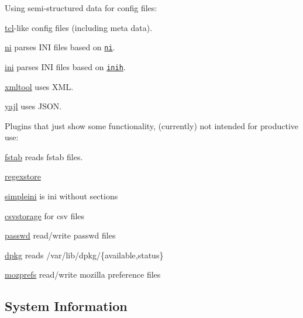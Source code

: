 Using semi-\/structured data for config files\+:


\begin{DoxyItemize}
\item \hyperlink{md_src_plugins_tcl_README_src_plugins_tcl_README_md}{tcl}-\/like config files (including meta data).
\item \hyperlink{md_src_plugins_ni_README_src_plugins_ni_README_md}{ni} parses I\+N\+I files based on \href{https://github.com/chazomaticus/bohr/blob/master/include/bohr/ni.h}{\tt ni}.
\item \hyperlink{md_src_plugins_ini_README_src_plugins_ini_README_md}{ini} parses I\+N\+I files based on \href{http://code.google.com/p/inih/}{\tt inih}.
\item \hyperlink{md_src_plugins_xmltool_README_src_plugins_xmltool_README_md}{xmltool} uses X\+M\+L.
\item \hyperlink{md_src_plugins_yajl_README_src_plugins_yajl_README_md}{yajl} uses J\+S\+O\+N.
\end{DoxyItemize}

Plugins that just show some functionality, (currently) not intended for productive use\+:


\begin{DoxyItemize}
\item \hyperlink{md_src_plugins_fstab_README_src_plugins_fstab_README_md}{fstab} reads fstab files.
\item \hyperlink{md_src_plugins_regexstore_README_src_plugins_regexstore_README_md}{regexstore}
\item \hyperlink{md_src_plugins_simpleini_README_src_plugins_simpleini_README_md}{simpleini} is ini without sections
\item \hyperlink{md_src_plugins_csvstorage_README_src_plugins_csvstorage_README_md}{csvstorage} for csv files
\item \hyperlink{md_src_plugins_passwd_README_src_plugins_passwd_README_md}{passwd} read/write passwd files
\item \hyperlink{md_src_plugins_dpkg_README_src_plugins_dpkg_README_md}{dpkg} reads /var/lib/dpkg/\{available,status\}
\item \hyperlink{md_src_plugins_mozprefs_README_src_plugins_mozprefs_README_md}{mozprefs} read/write mozilla preference files
\end{DoxyItemize}

\subsection*{System Information}

